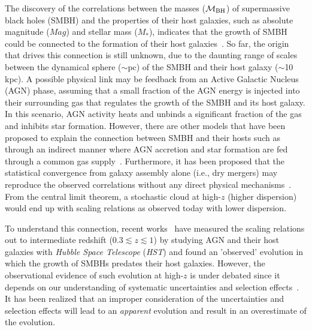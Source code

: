 \documentclass{natureprintstyle}
\newcommand{\mbh}{$\mathcal M_{\rm BH}$}
\newcommand{\mstar}{{$M_*$}}
\begin{document}
The discovery of the correlations between the masses (\mbh) of supermassive black holes (SMBH) and the properties of their host galaxies, such as absolute magnitude ($Mag$) and stellar mass (\mstar), indicates that the growth of SMBH could be connected to the formation of their host galaxies~\cite{Mag++98, F+M00, M+H03, H+R04, Gul++09}. So far, the origin that drives this connection is still unknown, due to the daunting range of scales between the dynamical sphere ($\sim$pc) of the SMBH and their host galaxy ($\sim$10 kpc). A possible physical link may be feedback from an Active Galactic Nucleus (AGN) phase, assuming that a small fraction of the AGN energy is injected into their surrounding gas that regulates the growth of the SMBH and its host galaxy. In this scenario, AGN activity heats and unbinds a significant fraction of the gas and inhibits star formation. However, there are other models that have been proposed to explain the connection between SMBH and their hosts such as through an indirect manner where AGN accretion and star formation are fed through a common gas supply~\cite{Cen2015, Menci2016}. Furthermore, it has been proposed that the statistical convergence from galaxy assembly alone (i.e., dry mergers) may reproduce the observed correlations without any direct physical mechanisms~\cite{Peng2007, Jahnke2011, Hirschmann2010}. From the central limit theorem, a stochastic cloud at high-$z$ (higher dispersion) would end up with scaling relations as observed today with lower dispersion.

To understand this connection, recent works~\cite{Park15, Tre++07, Bennert11, Woo++08} have measured the scaling relations out to intermediate redshift {($0.3\lesssim z \lesssim1$)} by studying AGN and their host galaxies with {\it Hubble Space Telescope} ({\it HST}) and found an 'observed' evolution in which the growth of SMBHs predates their host galaxies. However, the observational evidence of such evolution at high-$z$ is under debated since it depends on our understanding of systematic uncertainties and selection effects~\cite{Lauer2007}. It has been realized that an improper consideration of the uncertainties and selection effects will lead to an {\it apparent} evolution and result in an overestimate of the evolution\cite{Volonteri2011}.
\end{document}
